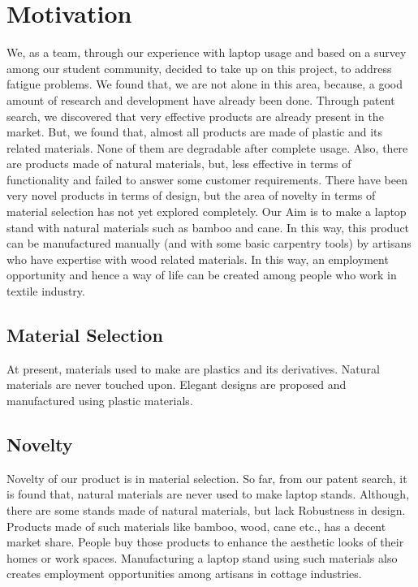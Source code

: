 \chapter{Motivation}

We, as a team, through our experience with laptop usage and based on a survey among our student community, decided to take up on this project, to address fatigue problems. We found that, we are not alone in this area,  because, a good amount of research and development have already been done. Through patent search, we discovered that very effective products are already present in the market. But, we found that, almost all products are made of plastic and its related materials. None of them are degradable after complete usage. Also, there are products made of natural materials, but, less effective in terms of functionality and failed to answer some customer requirements. There have been very novel products in terms of design, but the area of novelty in terms of  material selection has not yet explored completely. Our Aim is to make a laptop stand with natural materials such as bamboo and cane. In this way, this product can be manufactured manually (and with some basic carpentry tools) by artisans who have expertise with wood related materials. In this way, an employment opportunity and hence a way of life can be created among people who work in textile industry.

\section{Material Selection}

At present, materials used to make are plastics and its derivatives. Natural materials are never touched upon. Elegant designs are proposed and manufactured using plastic materials.

\section{Novelty}

Novelty of our product is in material selection. So far, from our patent search, it is found that, natural materials are never used to make laptop stands. Although, there are some stands made of natural materials, but lack Robustness in design. Products made of such materials like bamboo, wood, cane etc., has a decent market share. People buy those products to enhance the aesthetic looks of their homes or work spaces. Manufacturing a laptop stand using such materials also creates employment opportunities among artisans in cottage industries\cite{Pinterest}.


